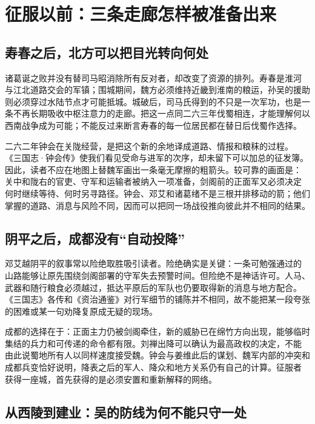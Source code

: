 \section{征服以前：三条走廊怎样被准备出来}

\subsection{寿春之后，北方可以把目光转向何处}

诸葛诞之败并没有替司马昭消除所有反对者，却改变了资源的排列。寿春是淮河
与江北道路交会的军镇；围城期间，魏方必须维持近畿到淮南的粮运，孙吴的援助
则必须穿过水陆节点才可能抵城。城破后，司马氏得到的不只是一次军功，也是一
条不再长期吸收中枢注意力的走廊。把这一点同二六三年伐蜀相连，才能理解何以
西南战争成为可能；不能反过来断言寿春的每一位居民都在替日后伐蜀作选择。

二六二年钟会在关陇经营，是把这个新的余地译成道路、情报和粮秣的过程。
《三国志·钟会传》使我们看见受命与进军的次序，却未留下可以加总的征发簿。
因此，读者不应在地图上替魏军画出一条毫无摩擦的粗箭头。较可靠的画面是：
关中和陇右的官吏、守军和运输者被纳入一项准备，剑阁前的正面军又必须决定
何时继续等待、何时另寻路径。钟会、邓艾和诸葛绪不是三根并排移动的箭；他们
掌握的道路、消息与风险不同，因而可以把同一场战役推向彼此并不相同的结果。

\subsection{阴平之后，成都没有“自动投降”}

邓艾越阴平的叙事常以险绝取胜吸引读者。险绝确实是关键：一条可勉强通过的
山路能够让原先围绕剑阁部署的守军失去预警时间。但险绝不是神话许可。人马、
武器和随行粮食必须越过，抵达平原后的军队也仍要取得新的消息与地方配合。
《三国志》各传和《资治通鉴》对行军细节的铺陈并不相同，故不能把某一段夸张
的困难或某一句劝降复原成无疑的现场。

成都的选择在于：正面主力仍被剑阁牵住，新的威胁已在绵竹方向出现，能够临时
集结的兵力和可传递的命令都有限。刘禅出降可以确认为最高政权的决定，不能
由此说蜀地所有人以同样速度接受魏。钟会与姜维此后的谋划、魏军内部的冲突和
成都兵变恰好说明，降表之后的军人、降众和地方关系仍有自己的计算。征服者
获得一座城，首先获得的是必须安置和重新解释的网络。

\subsection{从西陵到建业：吴的防线为何不能只守一处}

